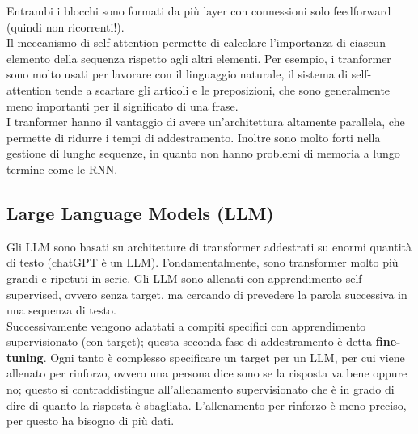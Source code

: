 Entrambi i blocchi sono formati da più layer con connessioni solo feedforward
(quindi non ricorrenti!).\\
Il meccanismo di self-attention permette di calcolare l'importanza di ciascun
elemento della sequenza rispetto agli altri elementi. Per esempio, i tranformer
sono molto usati per lavorare con il linguaggio naturale, il sistema di
self-attention tende a scartare gli articoli e le preposizioni, che sono
generalmente meno importanti per il significato di una frase.\\
I tranformer hanno il vantaggio di avere un'architettura altamente parallela,
che permette di ridurre i tempi di addestramento. Inoltre sono molto forti nella
gestione di lunghe sequenze, in quanto non hanno problemi di memoria a lungo
termine come le RNN.

\subsection{Large Language Models (LLM)}

Gli LLM sono basati su architetture di transformer addestrati su enormi quantità
di testo (chatGPT è un LLM). Fondamentalmente, sono transformer molto più grandi
e ripetuti in serie. Gli LLM sono allenati con apprendimento self-supervised,
ovvero senza target, ma cercando di prevedere la parola successiva in una
sequenza di testo.\\
Successivamente vengono adattati a compiti specifici con apprendimento
supervisionato (con target); questa seconda fase di addestramento è detta
\textbf{fine-tuning}. Ogni tanto è complesso specificare un target per un LLM,
per cui viene allenato per rinforzo, ovvero una persona dice sono se la risposta
va bene oppure no; questo si contraddistingue all'allenamento supervisionato che
è in grado di dire di quanto la risposta è sbagliata. L'allenamento per rinforzo
è meno preciso, per questo ha bisogno di più dati.
